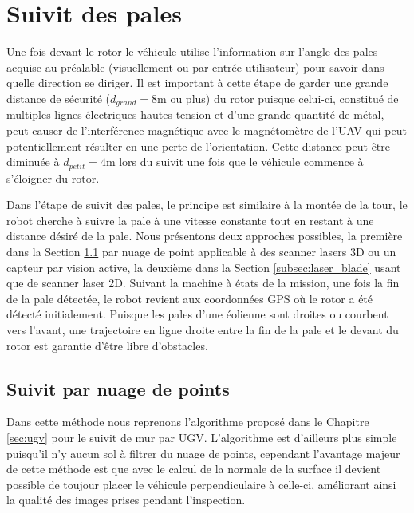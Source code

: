 \section{Suivit des pales}

Une fois devant le rotor le véhicule utilise l'information sur l'angle des pales acquise au préalable (visuellement ou par entrée utilisateur) pour savoir dans quelle direction se diriger. Il est important à cette étape de garder une grande distance de sécurité ($d_{grand} = 8$m ou plus) du rotor puisque celui-ci, constitué de multiples lignes électriques hautes tension et d'une grande quantité de métal, peut causer de l'interférence magnétique avec le magnétomètre de l'UAV qui peut potentiellement résulter en une perte de l'orientation. Cette distance peut être diminuée à $d_{petit} = 4$m lors du suivit une fois que le véhicule commence à s'éloigner du rotor.

Dans l'étape de suivit des pales, le principe est similaire à la montée de la tour, le robot cherche à suivre la pale à une vitesse constante tout en restant à une distance désiré de la pale. Nous présentons deux approches possibles, la première dans la Section \ref{subsec:pcl_blade} par nuage de point applicable à des scanner lasers 3D ou un capteur par vision active, la deuxième dans la Section \ref{subsec:laser_blade} usant que de scanner laser 2D.
Suivant la machine à états de la mission, une fois la fin de la pale détectée, le robot revient aux coordonnées GPS où le rotor a été détecté initialement. Puisque les pales d'une éolienne sont droites ou courbent vers l'avant, une trajectoire en ligne droite entre la fin de la pale et le devant du rotor est garantie d'être libre d'obstacles.

\subsection{Suivit par nuage de points}
\label{subsec:pcl_blade}

Dans cette méthode nous reprenons l'algorithme proposé dans le Chapitre \ref{sec:ugv} pour le suivit de mur par UGV. L'algorithme est d'ailleurs plus simple puisqu'il n'y aucun sol à filtrer du nuage de points, cependant l'avantage majeur de cette méthode est que avec le calcul de la normale de la surface il devient possible de toujour placer le véhicule perpendiculaire à celle-ci, améliorant ainsi la qualité des images prises pendant l'inspection.

